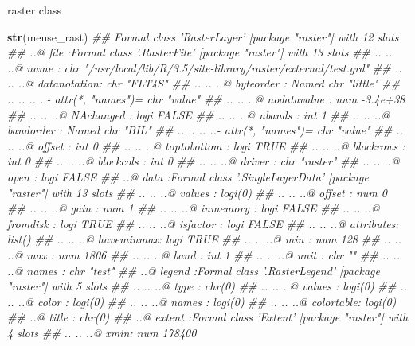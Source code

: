 \documentclass[11pt,ignorenonframetext,]{beamer}
\newenvironment{Shaded}{}{}
\newcommand{\CommentTok}[1]{\textcolor[rgb]{0.38,0.63,0.69}{\textit{#1}}}
\newcommand{\KeywordTok}[1]{\textcolor[rgb]{0.00,0.44,0.13}{\textbf{#1}}}
\newcommand{\NormalTok}[1]{#1}
\let\oldShaded\Shaded
\let\endoldShaded\endShaded
\renewenvironment{Shaded}{\footnotesize\begin{spacing}{0.9}\oldShaded}{\endoldShaded\end{spacing}}
\let\oldverbatim\verbatim
\let\endoldverbatim\endverbatim
\newcommand{\scriptoutput}{
  \renewenvironment{Shaded}{\scriptsize\begin{spacing}{0.9}\oldShaded}{\endoldShaded\end{spacing}}
  \renewenvironment{verbatim}{\scriptsize\begin{spacing}{0.9}\oldverbatim}{\endoldverbatim\end{spacing}}
}
\begin{document}
\begin{frame}[fragile]{raster class}
\protect\hypertarget{raster-class}{}

\scriptoutput

\begin{Shaded}
\begin{Highlighting}[]
\KeywordTok{str}\NormalTok{(meuse_rast)}
\CommentTok{## Formal class 'RasterLayer' [package "raster"] with 12 slots}
\CommentTok{##   ..@ file    :Formal class '.RasterFile' [package "raster"] with 13 slots}
\CommentTok{##   .. .. ..@ name        : chr "/usr/local/lib/R/3.5/site-library/raster/external/test.grd"}
\CommentTok{##   .. .. ..@ datanotation: chr "FLT4S"}
\CommentTok{##   .. .. ..@ byteorder   : Named chr "little"}
\CommentTok{##   .. .. .. ..- attr(*, "names")= chr "value"}
\CommentTok{##   .. .. ..@ nodatavalue : num -3.4e+38}
\CommentTok{##   .. .. ..@ NAchanged   : logi FALSE}
\CommentTok{##   .. .. ..@ nbands      : int 1}
\CommentTok{##   .. .. ..@ bandorder   : Named chr "BIL"}
\CommentTok{##   .. .. .. ..- attr(*, "names")= chr "value"}
\CommentTok{##   .. .. ..@ offset      : int 0}
\CommentTok{##   .. .. ..@ toptobottom : logi TRUE}
\CommentTok{##   .. .. ..@ blockrows   : int 0}
\CommentTok{##   .. .. ..@ blockcols   : int 0}
\CommentTok{##   .. .. ..@ driver      : chr "raster"}
\CommentTok{##   .. .. ..@ open        : logi FALSE}
\CommentTok{##   ..@ data    :Formal class '.SingleLayerData' [package "raster"] with 13 slots}
\CommentTok{##   .. .. ..@ values    : logi(0) }
\CommentTok{##   .. .. ..@ offset    : num 0}
\CommentTok{##   .. .. ..@ gain      : num 1}
\CommentTok{##   .. .. ..@ inmemory  : logi FALSE}
\CommentTok{##   .. .. ..@ fromdisk  : logi TRUE}
\CommentTok{##   .. .. ..@ isfactor  : logi FALSE}
\CommentTok{##   .. .. ..@ attributes: list()}
\CommentTok{##   .. .. ..@ haveminmax: logi TRUE}
\CommentTok{##   .. .. ..@ min       : num 128}
\CommentTok{##   .. .. ..@ max       : num 1806}
\CommentTok{##   .. .. ..@ band      : int 1}
\CommentTok{##   .. .. ..@ unit      : chr ""}
\CommentTok{##   .. .. ..@ names     : chr "test"}
\CommentTok{##   ..@ legend  :Formal class '.RasterLegend' [package "raster"] with 5 slots}
\CommentTok{##   .. .. ..@ type      : chr(0) }
\CommentTok{##   .. .. ..@ values    : logi(0) }
\CommentTok{##   .. .. ..@ color     : logi(0) }
\CommentTok{##   .. .. ..@ names     : logi(0) }
\CommentTok{##   .. .. ..@ colortable: logi(0) }
\CommentTok{##   ..@ title   : chr(0) }
\CommentTok{##   ..@ extent  :Formal class 'Extent' [package "raster"] with 4 slots}
\CommentTok{##   .. .. ..@ xmin: num 178400}

\end{Highlighting}
\end{Shaded}
\end{frame}
\end{document}
